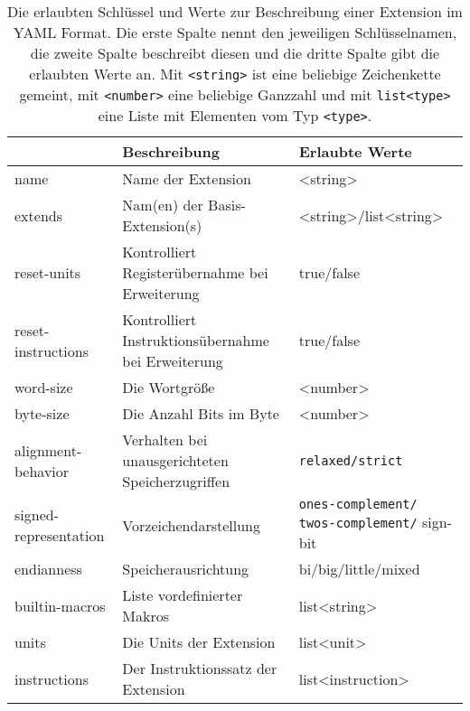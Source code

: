 \begin{table}[p]
  \centering
  \small
  \begin{tabular}{>{\ttfamily}l p{8.3cm} >{\ttfamily}p{3.5cm}}
    {\normalfont\bfseries Schlüssel} & \textbf{Beschreibung} & \textbf{Erlaubte Werte}\\
    \toprule
    name & Name der Extension & <string> \\

    extends & Nam(en) der Basis-Extension(s) & <string>/list<string>\\

    reset-units & Kontrolliert Registerübernahme bei Erweiterung & true/false\\

    reset-instructions & Kontrolliert Instruktionsübernahme bei Erweiterung & true/false\\

    word-size & Die Wortgröße & <number>\\

    byte-size & Die Anzahl Bits im Byte & <number>\\

    alignment-behavior & Verhalten bei unausgerichteten Speicherzugriffen & \texttt{relaxed/strict}\\

    signed-representation & Vorzeichendarstellung & \texttt{ones-complement/} \texttt{twos-complement/} sign-bit \\

    endianness & Speicherausrichtung & bi/big/little/mixed \\

    builtin-macros & Liste vordefinierter Makros & list<string> \\

    units & Die Units der Extension & list<unit> \\

    instructions & Der Instruktionssatz der Extension & list<instruction>
  \end{tabular}
  \caption{Die erlaubten Schlüssel und Werte zur Beschreibung einer Extension im YAML Format. Die erste Spalte nennt den jeweiligen Schlüsselnamen, die zweite Spalte beschreibt diesen und die dritte Spalte gibt die erlaubten Werte an. Mit \texttt{<string>} ist eine beliebige Zeichenkette gemeint, mit \texttt{<number>} eine beliebige Ganzzahl und mit \texttt{list<type>} eine Liste mit Elementen vom Typ \texttt{<type>}.}
  \label{tbl:isa-top-keys}


\end{table}
